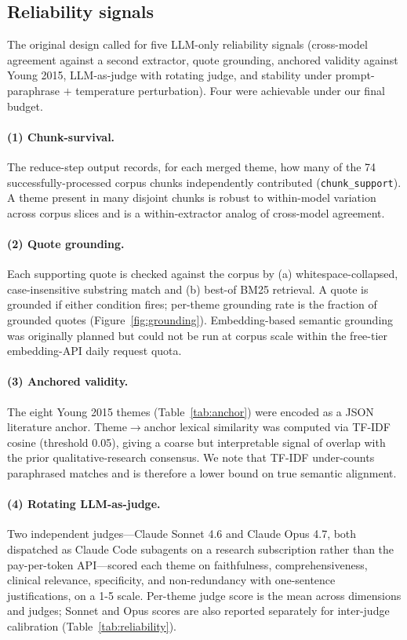 \documentclass[11pt]{article}
\begin{document}


\subsection{Reliability signals}

The original design called for five LLM-only reliability signals
(cross-model agreement against a second extractor, quote grounding,
anchored validity against Young 2015, LLM-as-judge with rotating judge,
and stability under prompt-paraphrase $+$ temperature perturbation).
Four were achievable under our final budget.

\paragraph{(1) Chunk-survival.} The reduce-step output records, for
each merged theme, how many of the 74 successfully-processed corpus
chunks independently contributed (\texttt{chunk\_support}). A theme
present in many disjoint chunks is robust to within-model variation
across corpus slices and is a within-extractor analog of cross-model
agreement.

\paragraph{(2) Quote grounding.} Each supporting quote is checked
against the corpus by (a) whitespace-collapsed, case-insensitive
substring match and (b) best-of BM25 retrieval. A quote is grounded
if either condition fires; per-theme grounding rate is the fraction
of grounded quotes (Figure~\ref{fig:grounding}). Embedding-based
semantic grounding was originally planned but could not be run at
corpus scale within the free-tier embedding-API daily request quota.

\paragraph{(3) Anchored validity.} The eight Young 2015 themes
(Table~\ref{tab:anchor}) were encoded as a JSON literature anchor.
Theme$\to$anchor lexical similarity was computed via TF-IDF cosine
(threshold 0.05), giving a coarse but interpretable signal of overlap
with the prior qualitative-research consensus. We note that TF-IDF
under-counts paraphrased matches and is therefore a lower bound on
true semantic alignment.

\paragraph{(4) Rotating LLM-as-judge.} Two independent judges---Claude
Sonnet 4.6 and Claude Opus 4.7, both dispatched as Claude Code
subagents on a research subscription rather than the pay-per-token
API---scored each theme on faithfulness, comprehensiveness, clinical
relevance, specificity, and non-redundancy with one-sentence
justifications, on a 1-5 scale. Per-theme judge score is the mean
across dimensions and judges; Sonnet and Opus scores are also reported
separately for inter-judge calibration (Table~\ref{tab:reliability}).
\end{document}
